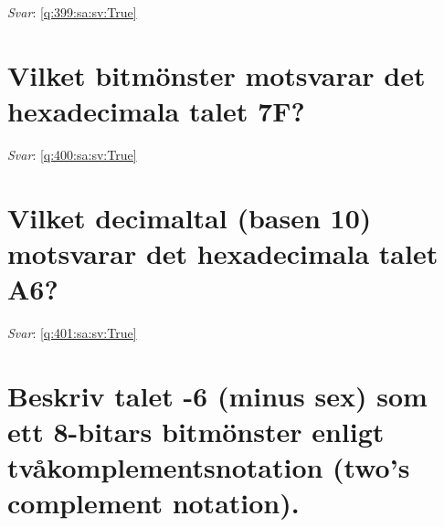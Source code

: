 \documentclass[a4paper,11pt,oneside]{book}
\begin{document}
\begin{sloppypar}
\label{q:399:sa:sv:False}

\vspace{2cm}

\noindent\makebox[\textwidth]{\hrulefill}

\vspace{1cm}

\textit{Svar}: \autoref{q:399:sa:sv:True}



\section{Vilket bitm\"onster motsvarar det hexadecimala talet 7F?}

\label{q:400:sa:sv:False}

\vspace{2cm}

\noindent\makebox[\textwidth]{\hrulefill}

\vspace{1cm}

\textit{Svar}: \autoref{q:400:sa:sv:True}



\section{Vilket decimaltal (basen 10) motsvarar det hexadecimala talet A6?}

\label{q:401:sa:sv:False}

\vspace{2cm}

\noindent\makebox[\textwidth]{\hrulefill}

\vspace{1cm}

\textit{Svar}: \autoref{q:401:sa:sv:True}



\section{Beskriv talet -6 (minus sex) som ett 8-bitars bitm\"onster enligt tv\r{a}komplementsnotation (two{\textquoteright}s complement notation).}

\label{q:402:sa:sv:False}

\vspace{2cm}

\noindent\makebox[\textwidth]{\hrulefill}

\vspace{1cm}


\end{sloppypar}
\end{document}
